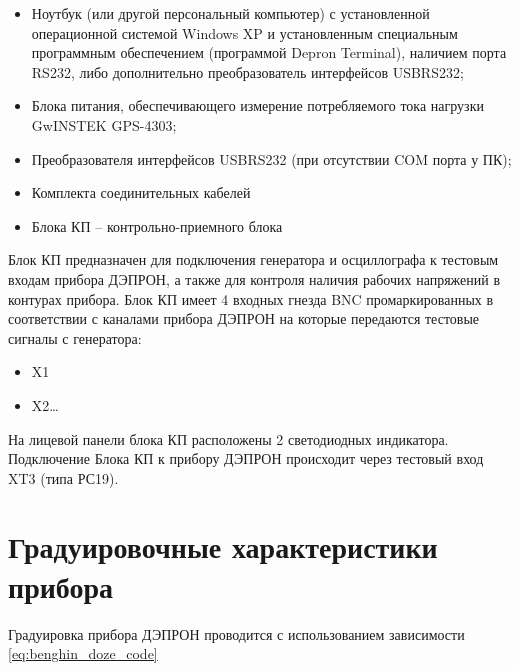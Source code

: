 \begin{itemize}
	\item 	Ноутбук (или другой персональный компьютер) с установленной операционной системой Windows XP и установленным специальным программным обеспечением (программой Depron Terminal), наличием порта RS232, либо дополнительно преобразователь интерфейсов USBRS232;
	
	
	\item 	Блока питания, обеспечивающего измерение потребляемого тока нагрузки GwINSTEK GPS-4303;
	
	
	\item 	Преобразователя интерфейсов USBRS232 (при отсутствии COM порта у ПК);
	
	
	\item 	Комплекта соединительных кабелей 
	
	
	\item 	Блока КП -- контрольно-приемного блока
	
	
\end{itemize}








Блок КП предназначен для подключения генератора и осциллографа к тестовым входам прибора ДЭПРОН, а также для контроля наличия рабочих напряжений в контурах прибора. Блок КП имеет 4 входных гнезда BNC промаркированных в соответствии с каналами прибора ДЭПРОН на которые передаются тестовые сигналы с генератора: 



\begin{itemize}
	
	\item 	X1	
	
	\item 	X2\ldots
		
\end{itemize}

На лицевой панели блока КП расположены 2 светодиодных индикатора. Подключение Блока КП к прибору ДЭПРОН происходит через тестовый вход XT3 (типа РС19).


\section{Градуировочные  характеристики прибора}
Градуировка прибора ДЭПРОН проводится с использованием зависимости \ref{eq:benghin_doze_code}

